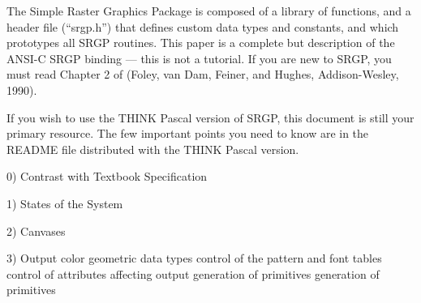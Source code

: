 \def\minorsect#1#2{\section{\ttit{#1~~~~}#2}}
\def\majorsect#1#2{\section{\ttit{#1~~~~}#2}}
\def\X11platform{1}
\def\Macplatform{2}
\def\ifX11#1{\ifnum\platform=\X11platform #1\fi}
\def\ifMac#1{\ifnum\platform=\Macplatform #1\fi}
\def\MACNOHAVE{\ifMac{\boldit{Currently not implemented on Mac version!}}}
\ifX11{}
\ifMac{}
\newpar
The Simple Raster Graphics Package is composed of a library of functions, 
and a
header file (``srgp.h'') that defines custom data types and constants, and
which prototypes all SRGP routines.  This paper is a complete but
 description of the ANSI-C SRGP binding --- this is
not a tutorial.  If you are new to SRGP, you must read Chapter 2 of
 (Foley, van Dam, Feiner,
and Hughes, Addison-Wesley, 1990).

\ifMac{\newpar}
\ifMac{If you wish to use the THINK Pascal 
version of SRGP, this document is still
your primary resource.  The few important points you need to know are in the
README file distributed with the THINK Pascal version.}


\begincode

\endcode

\item{0)} Contrast with Textbook Specification

\newdisplay

\item{1)} States of the System

\newdisplay

\item{2)} Canvases

\newdisplay

\item{3)} Output
 color
 geometric data types
 control of the pattern and font tables
 control of attributes affecting output
 generation of primitives
 generation of primitives

